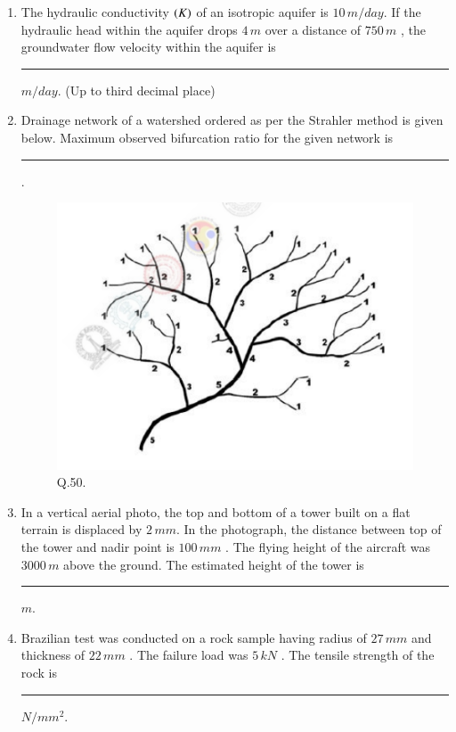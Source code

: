 \documentclass[journal,12pt,onecolumn]{IEEEtran}
\theoremstyle{remark}
\begin{document}
\begin{enumerate}
    \item The hydraulic conductivity $\left(K\right)$ of an isotropic aquifer is $10\, m/day$. If the hydraulic head within the aquifer drops $4\,m$ over a distance of $750\,m$ , the groundwater flow velocity within the aquifer is \rule{3cm}{0.15mm}$m/day$. (Up to third decimal place) \hfill{}
    \newpage
    \item Drainage network of a watershed ordered as per the Strahler method is given below. Maximum observed bifurcation ratio for the given network is \rule{3cm}{0.15mm}. \hfill{}
        \begin{figure}[h]
            \centering
            \includegraphics[width=0.5\columnwidth]{Figs/fig_7.png}
            \caption{Q.50.}
            \label{fig:placeholder_7}
        \end{figure}
    
    \item In a vertical aerial photo, the top and bottom of a tower built on a flat terrain is displaced by $2\,mm$. In the photograph, the distance between top of the tower and nadir point is $100\,mm$ . The flying height of the aircraft was $3000\,m$  above the ground. The estimated height of the tower is \rule{3cm}{0.15mm} $m$. \hfill{}
    
    \item Brazilian test was conducted on a rock sample having radius of $27\,mm$  and thickness of $22\, mm$ . The failure load was $5\,kN$ . The tensile strength of the rock is \rule{3cm}{0.15mm} $N/mm^{2}$. \hfill{}
    

\end{enumerate}
\end{document}
